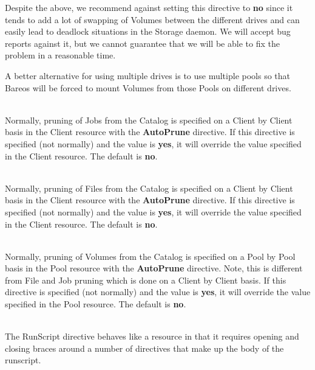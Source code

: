 \begin{description}
Despite the above, we recommend against setting this directive to
{\bf no} since
it tends to add a lot of swapping of Volumes between the different
drives and can easily lead to deadlock situations in the Storage
daemon. We will accept bug reports against it, but we cannot guarantee
that we will be able to fix the problem in a reasonable time.

A better alternative for using multiple drives is to use multiple
pools so that Bareos will be forced to mount Volumes from those Pools
on different drives.

\item [Prune Jobs = {\textless}yes{\textbar}no{\textgreater}] \hfill \\
Normally, pruning of Jobs from the Catalog is specified on a Client by
Client basis in the Client resource with the {\bf AutoPrune} directive.
If this directive is specified (not normally) and the value is {\bf
yes}, it will override the value specified in the Client resource.  The
default is {\bf no}.


\item [Prune Files = {\textless}yes{\textbar}no{\textgreater}] \hfill \\
Normally, pruning of Files from the Catalog is specified on a Client by
Client basis in the Client resource with the {\bf AutoPrune} directive.
If this directive is specified (not normally) and the value is {\bf
yes}, it will override the value specified in the Client resource.  The
default is {\bf no}.

\item [Prune Volumes = {\textless}yes{\textbar}no{\textgreater}] \hfill \\
Normally, pruning of Volumes from the Catalog is specified on a Pool by
Pool basis in the Pool resource with the {\bf AutoPrune} directive.
Note, this is different from File and Job pruning which is done on a
Client by Client basis.  If this directive is specified (not normally)
and the value is {\bf yes}, it will override the value specified in the
Pool resource.  The default is {\bf no}.

\item [RunScript \{{\textless}body-of-runscript{\textgreater}\}] \hfill \\
The RunScript directive behaves like a resource in that it
requires opening and closing braces around a number of directives
that make up the body of the runscript.


\end{description}
